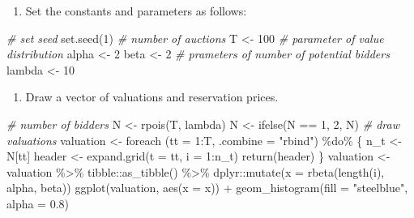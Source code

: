 \documentclass[
]{book}
\newenvironment{Shaded}{\begin{snugshade}}{\end{snugshade}}
\newcommand{\AttributeTok}[1]{\textcolor[rgb]{0.77,0.63,0.00}{#1}}
\newcommand{\CommentTok}[1]{\textcolor[rgb]{0.56,0.35,0.01}{\textit{#1}}}
\newcommand{\DecValTok}[1]{\textcolor[rgb]{0.00,0.00,0.81}{#1}}
\newcommand{\FloatTok}[1]{\textcolor[rgb]{0.00,0.00,0.81}{#1}}
\newcommand{\FunctionTok}[1]{\textcolor[rgb]{0.00,0.00,0.00}{#1}}
\newcommand{\NormalTok}[1]{#1}
\newcommand{\OtherTok}[1]{\textcolor[rgb]{0.56,0.35,0.01}{#1}}
\newcommand{\SpecialCharTok}[1]{\textcolor[rgb]{0.00,0.00,0.00}{#1}}
\newcommand{\StringTok}[1]{\textcolor[rgb]{0.31,0.60,0.02}{#1}}
\providecommand{\tightlist}{%
  \setlength{\itemsep}{0pt}\setlength{\parskip}{0pt}}
\begin{document}
\begin{enumerate}
\def\labelenumi{\arabic{enumi}.}
\tightlist
\item
  Set the constants and parameters as follows:
\end{enumerate}

\begin{Shaded}
\begin{Highlighting}[]
\CommentTok{\# set seed}
\FunctionTok{set.seed}\NormalTok{(}\DecValTok{1}\NormalTok{)}
\CommentTok{\# number of auctions}
\NormalTok{T }\OtherTok{\textless{}{-}} \DecValTok{100}
\CommentTok{\# parameter of value distribution}
\NormalTok{alpha }\OtherTok{\textless{}{-}} \DecValTok{2}
\NormalTok{beta }\OtherTok{\textless{}{-}} \DecValTok{2}
\CommentTok{\# prameters of number of potential bidders}
\NormalTok{lambda }\OtherTok{\textless{}{-}} \DecValTok{10}
\end{Highlighting}
\end{Shaded}

\begin{enumerate}
\def\labelenumi{\arabic{enumi}.}
\setcounter{enumi}{1}
\tightlist
\item
  Draw a vector of valuations and reservation prices.
\end{enumerate}

\begin{Shaded}
\begin{Highlighting}[]
\CommentTok{\# number of bidders}
\NormalTok{N }\OtherTok{\textless{}{-}} \FunctionTok{rpois}\NormalTok{(T, lambda)}
\NormalTok{N }\OtherTok{\textless{}{-}} \FunctionTok{ifelse}\NormalTok{(N }\SpecialCharTok{==} \DecValTok{1}\NormalTok{, }\DecValTok{2}\NormalTok{, N)}
\CommentTok{\# draw valuations}
\NormalTok{valuation }\OtherTok{\textless{}{-}}
  \FunctionTok{foreach}\NormalTok{ (}\AttributeTok{tt =} \DecValTok{1}\SpecialCharTok{:}\NormalTok{T, }\AttributeTok{.combine =} \StringTok{"rbind"}\NormalTok{) }\SpecialCharTok{\%do\%}\NormalTok{ \{}
\NormalTok{    n\_t }\OtherTok{\textless{}{-}}\NormalTok{ N[tt]}
\NormalTok{    header }\OtherTok{\textless{}{-}} \FunctionTok{expand.grid}\NormalTok{(}\AttributeTok{t =}\NormalTok{ tt, }\AttributeTok{i =} \DecValTok{1}\SpecialCharTok{:}\NormalTok{n\_t) }
    \FunctionTok{return}\NormalTok{(header)}
\NormalTok{  \}}
\NormalTok{valuation }\OtherTok{\textless{}{-}}\NormalTok{ valuation }\SpecialCharTok{\%\textgreater{}\%}
\NormalTok{  tibble}\SpecialCharTok{::}\FunctionTok{as\_tibble}\NormalTok{() }\SpecialCharTok{\%\textgreater{}\%}
\NormalTok{  dplyr}\SpecialCharTok{::}\FunctionTok{mutate}\NormalTok{(}\AttributeTok{x =} \FunctionTok{rbeta}\NormalTok{(}\FunctionTok{length}\NormalTok{(i), alpha, beta))}
\FunctionTok{ggplot}\NormalTok{(valuation, }\FunctionTok{aes}\NormalTok{(}\AttributeTok{x =}\NormalTok{ x)) }\SpecialCharTok{+} \FunctionTok{geom\_histogram}\NormalTok{(}\AttributeTok{fill =} \StringTok{"steelblue"}\NormalTok{, }\AttributeTok{alpha =} \FloatTok{0.8}\NormalTok{)}
\end{Highlighting}
\end{Shaded}
\end{document}
